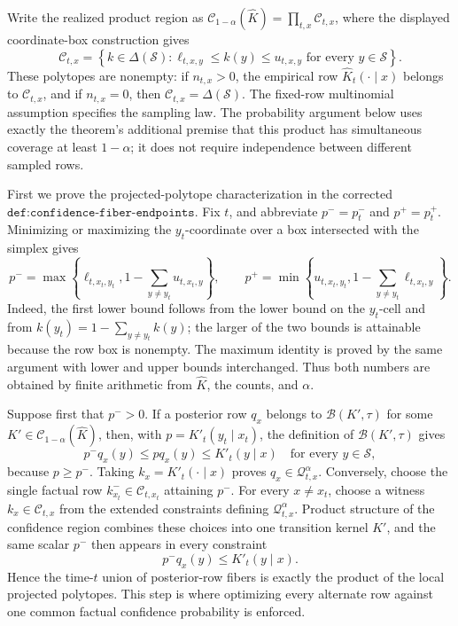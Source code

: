 Write the realized product region as
\(\mathcal C_{1-\alpha}(\widehat K)=\prod_{t,x}\mathcal C_{t,x}\),
where the displayed coordinate-box construction gives
\[
 \mathcal C_{t,x}
 =\left\{k\in\Delta(\mathcal S):
       \ell_{t,x,y}\le k(y)\le u_{t,x,y}
       \text{ for every }y\in\mathcal S\right\}.
\]
These polytopes are nonempty: if \(n_{t,x}>0\), the empirical row
\(\widehat K_t(\cdot\mid x)\) belongs to \(\mathcal C_{t,x}\), and if
\(n_{t,x}=0\), then \(\mathcal C_{t,x}=\Delta(\mathcal S)\).  The fixed-row
multinomial assumption specifies the sampling law.  The probability argument
below uses exactly the theorem's additional premise that this product has
simultaneous coverage at least \(1-\alpha\); it does not require independence
between different sampled rows.

First we prove the projected-polytope characterization in the corrected
\(\texttt{def:confidence-fiber-endpoints}\).  Fix \(t\), and abbreviate
\(p^-=p_t^-\) and \(p^+=p_t^+\).  Minimizing or maximizing the
\(y_t\)-coordinate over a box intersected with the simplex gives
\[
 p^-=\max\!\left\{\ell_{t,x_t,y_t},
        1-\sum_{y\ne y_t}u_{t,x_t,y}\right\},
 \qquad
 p^+=\min\!\left\{u_{t,x_t,y_t},
        1-\sum_{y\ne y_t}\ell_{t,x_t,y}\right\}.
\]
Indeed, the first lower bound follows from the lower bound on the
\(y_t\)-cell and from
\(k(y_t)=1-\sum_{y\ne y_t}k(y)\); the larger of the two bounds is attainable
because the row box is nonempty.  The maximum identity is proved by the same
argument with lower and upper bounds interchanged.  Thus both numbers are
obtained by finite arithmetic from \(\widehat K\), the counts, and
\(\alpha\).

Suppose first that \(p^->0\).  If a posterior row \(q_x\) belongs to
\(\mathcal B(K',\tau)\) for some \(K'\in\mathcal C_{1-\alpha}(\widehat K)\),
then, with \(p=K'_t(y_t\mid x_t)\), the definition of
\(\mathcal B(K',\tau)\) gives
\[
 p^-q_x(y)\le p q_x(y)\le K'_t(y\mid x)
 \quad\text{for every }y\in\mathcal S,
\]
because \(p\ge p^-\).  Taking \(k_x=K'_t(\cdot\mid x)\) proves
\(q_x\in\mathcal Q_{t,x}^{\alpha}\).  Conversely, choose the single factual
row \(k_{x_t}^-\in\mathcal C_{t,x_t}\) attaining \(p^-\).  For every
\(x\ne x_t\), choose a witness \(k_x\in\mathcal C_{t,x}\) from the extended
constraints defining \(\mathcal Q_{t,x}^{\alpha}\).  Product structure of
the confidence region combines these choices into one transition kernel
\(K'\), and the same scalar \(p^-\) then appears in every constraint
\[
 p^-q_x(y)\le K'_t(y\mid x).
\]
Hence the time-\(t\) union of posterior-row fibers is exactly the product of
the local projected polytopes.  This step is where optimizing every alternate
row against one common factual confidence probability is enforced.

